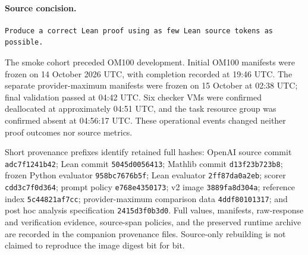 \paragraph{Source concision.}
\begin{verbatim}
Produce a correct Lean proof using as few Lean source tokens as possible.
\end{verbatim}

The smoke cohort preceded OM100 development. Initial OM100 manifests were frozen on 14 October 2026 UTC, with completion recorded at 19:46 UTC. The separate provider-maximum manifests were frozen on 15 October at 02:38 UTC; final validation passed at 04:42 UTC. Six checker VMs were confirmed deallocated at approximately 04:51 UTC, and the task resource group was confirmed absent at 04:56:17 UTC. These operational events changed neither proof outcomes nor source metrics.

Short provenance prefixes identify retained full hashes: OpenAI source commit \texttt{adc7f1241b42}; Lean commit \texttt{5045d0056413}; Mathlib commit \texttt{d13f23b723b8}; frozen Python evaluator \texttt{958bc7676b5f}; Lean evaluator \texttt{2ff87da0a2eb}; scorer \texttt{cdd3c7f0d364}; prompt policy \texttt{e768e4350173}; v2 image \texttt{3889fa8d304a}; reference index \texttt{5c44821af7cc}; provider-maximum comparison data \texttt{4ddf80101317}; and post hoc analysis specification \texttt{2415d3f0b3d0}. Full values, manifests, raw-response and verification evidence, source-span policies, and the preserved runtime archive are recorded in the companion provenance files. Source-only rebuilding is not claimed to reproduce the image digest bit for bit.
